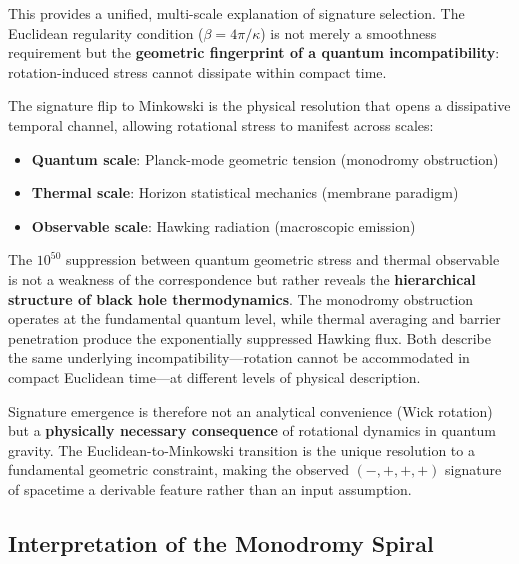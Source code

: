 \documentclass[11pt]{article}
\begin{document}
This provides a unified, multi-scale explanation of signature selection. The Euclidean 
regularity condition ($\beta = 4\pi/\kappa$) is not merely a smoothness requirement 
but the \textbf{geometric fingerprint of a quantum incompatibility}: rotation-induced 
stress cannot dissipate within compact time. 

The signature flip to Minkowski is the physical resolution that opens a dissipative 
temporal channel, allowing rotational stress to manifest across scales:
\begin{itemize}
\item \textbf{Quantum scale}: Planck-mode geometric tension (monodromy obstruction)
\item \textbf{Thermal scale}: Horizon statistical mechanics (membrane paradigm)  
\item \textbf{Observable scale}: Hawking radiation (macroscopic emission)
\end{itemize}

The $10^{50}$ suppression between quantum geometric stress and thermal observable 
is not a weakness of the correspondence but rather reveals the \textbf{hierarchical 
structure of black hole thermodynamics}. The monodromy obstruction operates at the 
fundamental quantum level, while thermal averaging and barrier penetration produce 
the exponentially suppressed Hawking flux. Both describe the same underlying 
incompatibility---rotation cannot be accommodated in compact Euclidean time---at 
different levels of physical description.

Signature emergence is therefore not an analytical convenience (Wick rotation) but 
a \textbf{physically necessary consequence} of rotational dynamics in quantum gravity. 
The Euclidean-to-Minkowski transition is the unique resolution to a fundamental 
geometric constraint, making the observed $(-,+,+,+)$ signature of spacetime a 
derivable feature rather than an input assumption.

\subsection*{Interpretation of the Monodromy Spiral}
\end{document}
